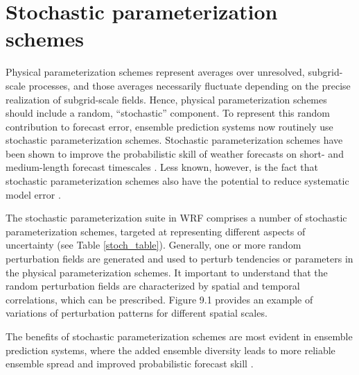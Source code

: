 \chapter{Stochastic parameterization schemes}
\label{stoch}

Physical parameterization schemes represent averages over unresolved,
subgrid-scale processes, and those averages necessarily 
fluctuate depending on the precise realization of subgrid-scale
fields.  Hence, physical parameterization schemes should include a random,
``stochastic'' component.  To represent this random contribution to
forecast error, ensemble prediction systems now routinely use stochastic
parameterization schemes.
Stochastic parameterization schemes have been shown to improve the
probabilistic skill of weather forecasts on short- and medium-length forecast
timescales 
\citep[e.g.][]{Be09,Be11,leutbecher2017stochastic}.
Less known, however, is the fact that stochastic parameterization schemes also have the
potential to reduce systematic model error 
\citep[e.g.][]{berner2017stochastic}.

The stochastic parameterization suite in WRF comprises a number of
stochastic parameterization schemes, targeted at representing different aspects 
of uncertainty (see Table \ref{stoch_table}). Generally, one or more random
perturbation fields are generated and used to perturb tendencies or
parameters in the physical parameterization schemes.  It important to understand 
that the random perturbation fields are characterized by spatial and temporal
correlations, which can be prescribed.  Figure 9.1 provides an example of 
variations of perturbation patterns for different spatial scales.

The benefits of stochastic parameterization schemes are most evident in ensemble 
prediction systems, where the added ensemble diversity leads to more reliable 
ensemble spread and improved probabilistic forecast skill \citep[e.g.][]{Be15}.

